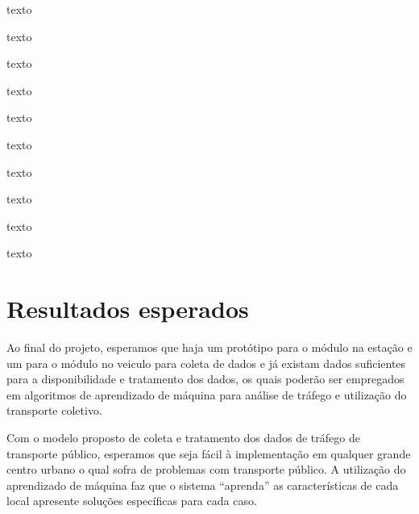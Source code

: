 \documentclass[12pt]{uftpibic}
\begin{document}
{\color{white}
texto

texto

texto

texto

texto

texto

texto

texto

texto

texto
}

\chapter{Resultados esperados}

Ao final do projeto, esperamos que haja um protótipo para o módulo na estação e um para o módulo no veiculo para coleta de dados e já existam dados suficientes para a disponibilidade e tratamento dos dados, os quais poderão ser empregados em algoritmos de aprendizado de máquina para análise de tráfego e utilização do transporte coletivo.

Com o modelo proposto de coleta e tratamento dos dados de tráfego de transporte público, esperamos que seja fácil à implementação em qualquer grande centro urbano o qual sofra de problemas com transporte público. A utilização do aprendizado de máquina faz que o sistema ``aprenda'' as características de cada local apresente soluções específicas para cada caso.



\end{document}
